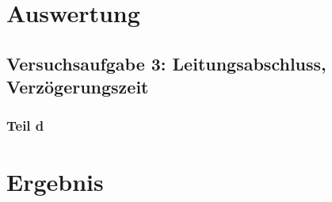 \section{Auswertung}

\subsection{Versuchsaufgabe 3: Leitungsabschluss, Verzögerungszeit}

\subsubsection{Teil d}


\section{Ergebnis}

\IfFileExists{\bibliographyfile}{
	
}{}



